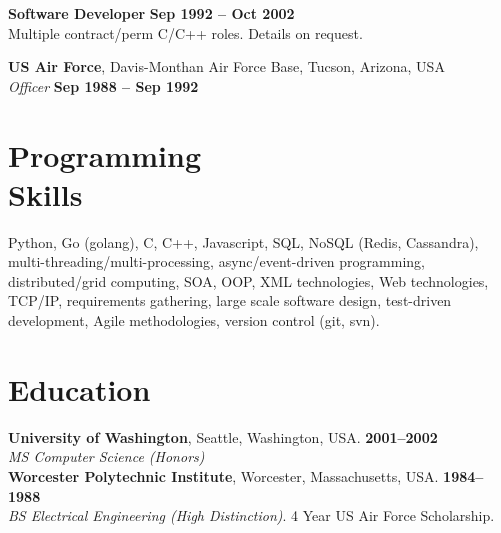 \documentclass[margin,line]{resume}
\begin{document}
\begin{resume}
    \textbf{Software Developer}  \hfill \textbf{Sep 1992 -- Oct 2002}\\
	Multiple contract/perm C/C++ roles. Details on request. 
	
    \textbf{US Air Force}, Davis-Monthan Air Force Base, Tucson, Arizona, USA\\
    \textsl{Officer} \hfill \textbf{Sep 1988 -- Sep 1992}\\
	
    \section{\mysidestyle Programming\\Skills} 

    Python, Go (golang), C, C++, Javascript, SQL, NoSQL (Redis, Cassandra), multi-threading/multi-processing, 
    async/event-driven programming, distributed/grid computing, SOA, OOP, XML technologies, 
    Web technologies, TCP/IP, requirements gathering, large scale software design, test-driven development, 
    Agile methodologies, version control (git, svn).

    \section{\mysidestyle Education}
	\textbf{University of Washington}, Seattle, Washington, USA. \hfill \textbf{2001--2002}\\
	\textsl{MS Computer Science (Honors)} \\
	\textbf{Worcester Polytechnic Institute}, Worcester, Massachusetts, USA. \hfill \textbf{1984--1988}\\
	\textsl{BS Electrical Engineering (High Distinction)}. 4 Year US Air Force Scholarship. 
    

\end{resume}
\end{document}
